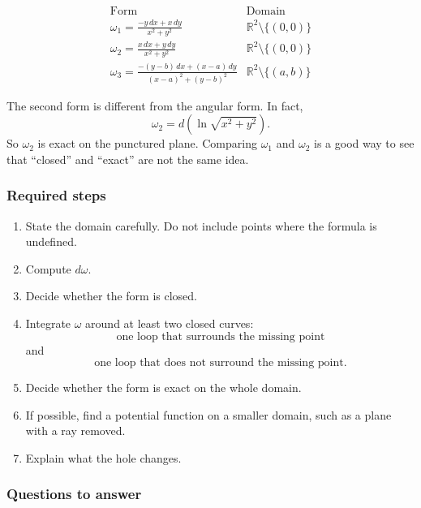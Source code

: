 \[
\begin{array}{c|c}
\text{Form} & \text{Domain} \\ \hline
\displaystyle
\omega_1=\frac{-y\,dx+x\,dy}{x^2+y^2}
&
\mathbb R^2\setminus\{(0,0)\}
\\[4mm]
\displaystyle
\omega_2=\frac{x\,dx+y\,dy}{x^2+y^2}
&
\mathbb R^2\setminus\{(0,0)\}
\\[4mm]
\displaystyle
\omega_3=
\frac{-(y-b)\,dx+(x-a)\,dy}{(x-a)^2+(y-b)^2}
&
\mathbb R^2\setminus\{(a,b)\}
\end{array}
\]

The second form is different from the angular form.  In fact,
\[
    \omega_2=d\left(\ln\sqrt{x^2+y^2}\right).
\]
So \(\omega_2\) is exact on the punctured plane.  Comparing \(\omega_1\) and
\(\omega_2\) is a good way to see that ``closed'' and ``exact'' are not the same idea.

\subsubsection*{Required steps}

\begin{enumerate}
\item State the domain carefully.  Do not include points where the formula is undefined.

\item Compute \(d\omega\).

\item Decide whether the form is closed.

\item Integrate \(\omega\) around at least two closed curves:
\[
    \text{one loop that surrounds the missing point}
\]
and
\[
    \text{one loop that does not surround the missing point}.
\]

\item Decide whether the form is exact on the whole domain.

\item If possible, find a potential function on a smaller domain, such as a plane with a
ray removed.

\item Explain what the hole changes.
\end{enumerate}

\subsubsection*{Questions to answer}

